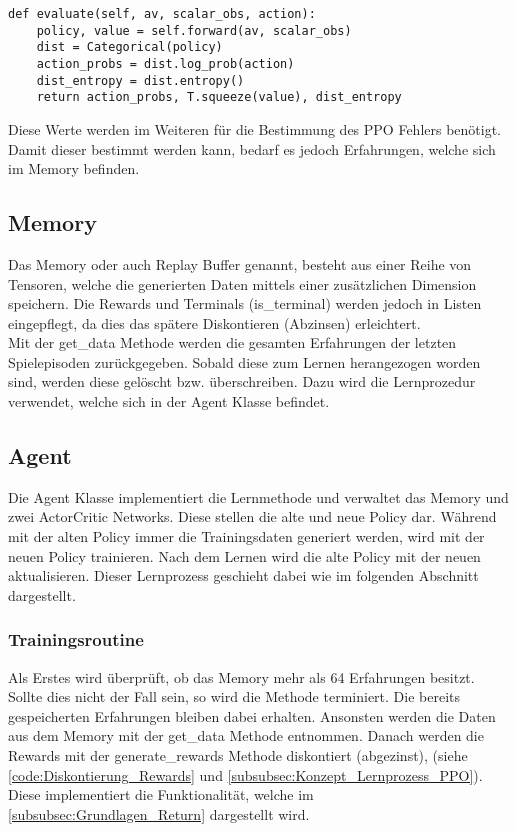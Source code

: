 \begin{lstlisting}[caption=Darstellung der evaluate Methode, label=code:evaluate_Methode, style=Python]
def evaluate(self, av, scalar_obs, action):
	policy, value = self.forward(av, scalar_obs)
	dist = Categorical(policy)
	action_probs = dist.log_prob(action)
	dist_entropy = dist.entropy()
	return action_probs, T.squeeze(value), dist_entropy
\end{lstlisting}
Diese Werte werden im Weiteren für die Bestimmung des PPO Fehlers benötigt. Damit dieser bestimmt werden kann, bedarf es jedoch Erfahrungen, welche sich im Memory befinden.

\subsection{Memory} \label{subsec:Implementierung_Memory_PPO}
Das Memory oder auch Replay Buffer genannt, besteht aus einer Reihe von Tensoren, welche die generierten Daten mittels einer zusätzlichen Dimension speichern. Die Rewards und Terminals (is\_terminal) werden jedoch in Listen eingepflegt, da dies das spätere Diskontieren (Abzinsen) erleichtert.\\
Mit der get\_data Methode werden die gesamten Erfahrungen der letzten Spielepisoden zurückgegeben. 
Sobald diese zum Lernen herangezogen worden sind, werden diese gelöscht bzw. überschreiben. Dazu wird die Lernprozedur verwendet, welche sich in der Agent Klasse befindet. 

\subsection{Agent} \label{subsec:Implementierung_PPO_Agent}
Die Agent Klasse implementiert die Lernmethode und verwaltet das Memory und zwei ActorCritic Networks. Diese stellen die alte und neue Policy dar. Während mit der alten Policy immer die Trainingsdaten generiert werden, wird mit der neuen Policy trainieren. Nach dem Lernen wird die alte Policy mit der neuen aktualisieren. Dieser Lernprozess geschieht dabei wie im folgenden Abschnitt dargestellt.

\subsubsection{Trainingsroutine} \label{subsubsec:Implementierung_Trainingsroutine_PPO}
Als Erstes wird überprüft, ob das Memory mehr als 64 Erfahrungen besitzt. Sollte dies nicht der Fall sein, so wird die Methode terminiert. 
Die bereits gespeicherten Erfahrungen bleiben dabei erhalten.
Ansonsten werden die Daten aus dem Memory mit der get\_data Methode entnommen.
Danach werden die Rewards mit der generate\_rewards Methode diskontiert (abgezinst), (siehe \autoref{code:Diskontierung_Rewards} und \autoref{subsubsec:Konzept_Lernprozess_PPO}). Diese implementiert die Funktionalität, welche im \autoref{subsubsec:Grundlagen_Return} dargestellt wird.

